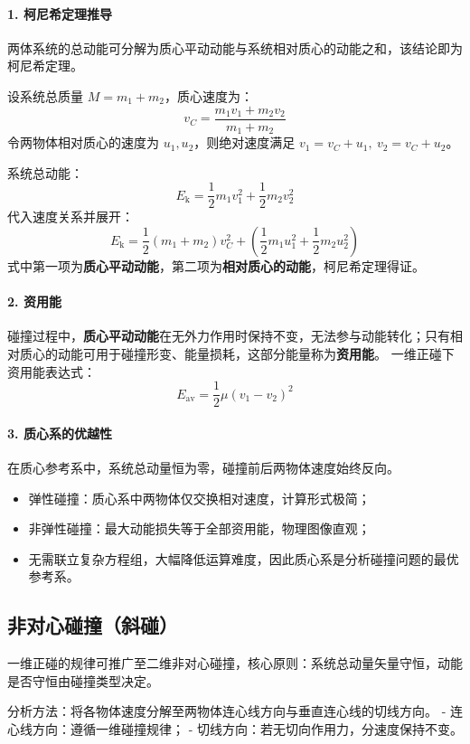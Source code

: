 \paragraph{1. 柯尼希定理推导}
两体系统的总动能可分解为质心平动动能与系统相对质心的动能之和，该结论即为柯尼希定理。

设系统总质量 \(M = m_1 + m_2\)，质心速度为：
\[
v_C = \frac{m_1 v_1 + m_2 v_2}{m_1 + m_2}
\]
令两物体相对质心的速度为 \(u_1, u_2\)，则绝对速度满足 \(v_1 = v_C + u_1,\ v_2 = v_C + u_2\)。

系统总动能：
\[
E_\mathrm{k} = \frac{1}{2}m_1 v_1^2 + \frac{1}{2}m_2 v_2^2
\]
代入速度关系并展开：
\[
E_\mathrm{k} = \frac{1}{2}(m_1+m_2)v_C^2 + \left( \frac{1}{2}m_1 u_1^2 + \frac{1}{2}m_2 u_2^2 \right)
\]
式中第一项为\textbf{质心平动动能}，第二项为\textbf{相对质心的动能}，柯尼希定理得证。

\paragraph{2. 资用能}
碰撞过程中，\textbf{质心平动动能}在无外力作用时保持不变，无法参与动能转化；只有相对质心的动能可用于碰撞形变、能量损耗，这部分能量称为\textbf{资用能}。
一维正碰下资用能表达式：
\[
E_\mathrm{av} = \frac{1}{2}\mu (v_1 - v_2)^2
\]

\paragraph{3. 质心系的优越性}
在质心参考系中，系统总动量恒为零，碰撞前后两物体速度始终反向。
\begin{itemize}
    \item 弹性碰撞：质心系中两物体仅交换相对速度，计算形式极简；
    \item 非弹性碰撞：最大动能损失等于全部资用能，物理图像直观；
    \item 无需联立复杂方程组，大幅降低运算难度，因此质心系是分析碰撞问题的最优参考系。
\end{itemize}

\subsection{非对心碰撞（斜碰）}
一维正碰的规律可推广至二维非对心碰撞，核心原则：系统总动量矢量守恒，动能是否守恒由碰撞类型决定。

分析方法：将各物体速度分解至两物体连心线方向与垂直连心线的切线方向。
- 连心线方向：遵循一维碰撞规律；
- 切线方向：若无切向作用力，分速度保持不变。

\begin{center}
\end{center}

